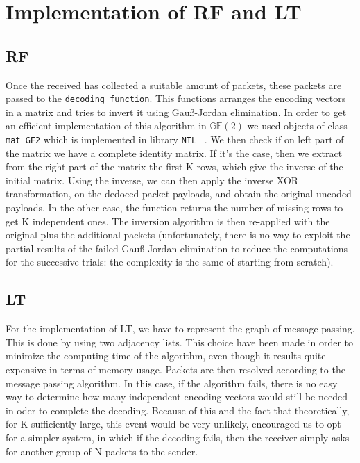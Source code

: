 \section{Implementation of RF and LT}
\subsection{RF}
Once the received has collected a suitable amount of packets, these packets are passed to the \texttt{decoding\_function}. This functions arranges the encoding vectors in a matrix and tries to invert it using Gau{\ss}-Jordan elimination. In order to get an efficient implementation of this algorithm in $\mathds{G}\mathds{F}(2)$ we used objects of class \texttt{mat\_GF2} which is implemented in library \texttt{NTL} ~\cite{NTL}. We then check if on left part of the matrix we have a complete identity matrix. If it's the case, then we extract from the right part of the matrix the first K rows, which give the inverse of the initial matrix. Using the inverse, we can then apply the inverse XOR transformation, on the dedoced packet payloads, and obtain the original uncoded payloads. In the other case, the function returns the number of missing rows to get K independent ones. The inversion algorithm is then re-applied with the original plus the additional packets (unfortunately, there is no way to exploit the partial results of the failed Gau{\ss}-Jordan elimination to reduce the computations for the successive trials: the complexity is the same of starting from scratch).
\subsection{LT}
For the implementation of LT, we have to represent the graph of message passing. This is done by using two adjacency lists. This choice have been made in order to minimize the computing time of the algorithm, even though it results quite expensive in terms of memory usage. Packets are then resolved according to the message passing algorithm. In this case, if the algorithm fails, there is no easy way to determine how many independent encoding vectors would still be needed in oder to complete the decoding. Because of this and the fact that theoretically, for K sufficiently large, this event would be very unlikely, encouraged us to opt for a simpler system, in which if the decoding fails, then the receiver simply asks for another group of N packets to the sender. 
